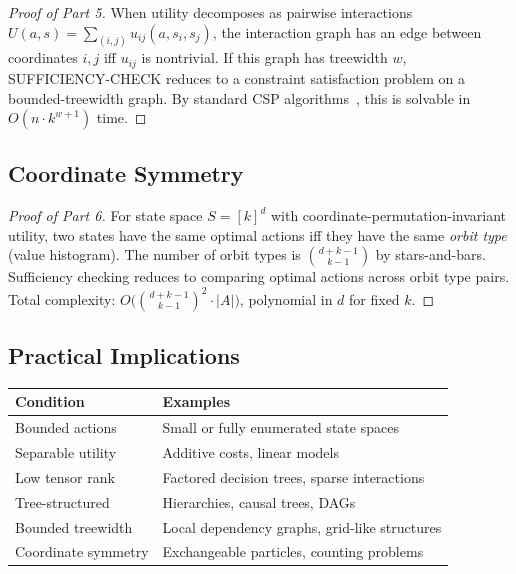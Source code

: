 \begin{proof}[Proof of Part 5]
When utility decomposes as pairwise interactions $U(a,s) = \sum_{(i,j)} u_{ij}(a, s_i, s_j)$, the interaction graph has an edge between coordinates $i,j$ iff $u_{ij}$ is nontrivial. If this graph has treewidth $w$, SUFFICIENCY-CHECK reduces to a constraint satisfaction problem on a bounded-treewidth graph. By standard CSP algorithms~\cite{bodlaender1993tourist, freuder1990complexity}, this is solvable in $O(n \cdot k^{w+1})$ time.
\end{proof}

\subsection{Coordinate Symmetry}

\begin{proof}[Proof of Part 6]
For state space $S = [k]^d$ with coordinate-permutation-invariant utility, two states have the same optimal actions iff they have the same \emph{orbit type} (value histogram). The number of orbit types is $\binom{d+k-1}{k-1}$ by stars-and-bars. Sufficiency checking reduces to comparing optimal actions across orbit type pairs. Total complexity: $O\bigl(\binom{d+k-1}{k-1}^2 \cdot |A|\bigr)$, polynomial in $d$ for fixed $k$.
\end{proof}

\subsection{Practical Implications}

\begin{center}
\begin{tabular}{ll}
\toprule
\textbf{Condition} & \textbf{Examples} \\
\midrule
Bounded actions & Small or fully enumerated state spaces \\
Separable utility & Additive costs, linear models \\
Low tensor rank & Factored decision trees, sparse interactions \\
Tree-structured & Hierarchies, causal trees, DAGs \\
Bounded treewidth & Local dependency graphs, grid-like structures \\
Coordinate symmetry & Exchangeable particles, counting problems \\
\bottomrule
\end{tabular}
\end{center}

